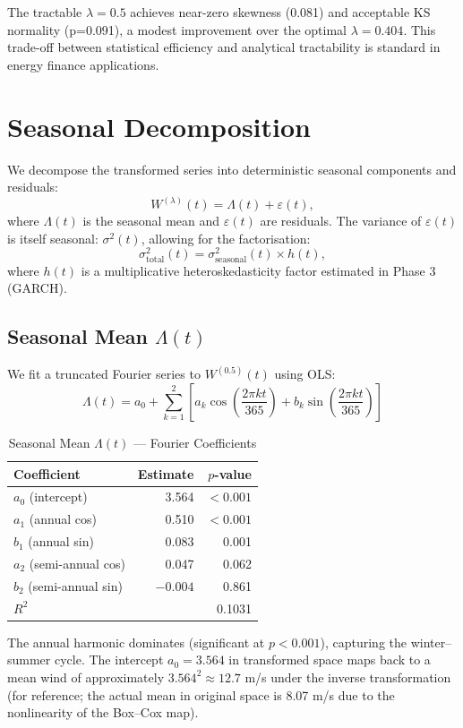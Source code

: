 \documentclass[11pt]{article}
\begin{document}
The tractable $\lambda=0.5$ achieves near-zero skewness (0.081) and acceptable KS normality (p=0.091), a modest improvement over the optimal $\lambda=0.404$. This trade-off between statistical efficiency and analytical tractability is standard in energy finance applications.

\section{Seasonal Decomposition}

We decompose the transformed series into deterministic seasonal components and residuals:
$$W^{(\lambda)}(t) = \Lambda(t) + \varepsilon(t),$$
where $\Lambda(t)$ is the seasonal mean and $\varepsilon(t)$ are residuals. The variance of $\varepsilon(t)$ is itself seasonal: $\sigma^2(t)$, allowing for the factorisation:
$$\sigma^2_{\text{total}}(t) = \sigma^2_{\text{seasonal}}(t) \times h(t),$$
where $h(t)$ is a multiplicative heteroskedasticity factor estimated in Phase 3 (GARCH).

\subsection{Seasonal Mean $\Lambda(t)$}

We fit a truncated Fourier series to $W^{(0.5)}(t)$ using OLS:
$$\Lambda(t) = a_0 + \sum_{k=1}^{2} \left[ a_k \cos\left(\frac{2\pi k t}{365}\right) + b_k \sin\left(\frac{2\pi k t}{365}\right) \right]$$

\begin{table}[h]
\centering
\caption{Seasonal Mean $\Lambda(t)$ --- Fourier Coefficients}
\label{tab:fourier_mean}
\begin{tabular}{lrr}
\toprule
\textbf{Coefficient} & \textbf{Estimate} & \textbf{$p$-value} \\
\midrule
$a_0$ (intercept) & 3.564 & $<0.001$ \\
$a_1$ (annual cos) & 0.510 & $<0.001$ \\
$b_1$ (annual sin) & 0.083 & 0.001 \\
$a_2$ (semi-annual cos) & 0.047 & 0.062 \\
$b_2$ (semi-annual sin) & $-0.004$ & 0.861 \\
\midrule
$R^2$ & \multicolumn{2}{r}{0.1031} \\
\bottomrule
\end{tabular}
\end{table}

The annual harmonic dominates (significant at $p<0.001$), capturing the winter--summer cycle. The intercept $a_0 = 3.564$ in transformed space maps back to a mean wind of approximately $3.564^2 \approx 12.7$ m/s under the inverse transformation (for reference; the actual mean in original space is 8.07 m/s due to the nonlinearity of the Box--Cox map).
\end{document}
